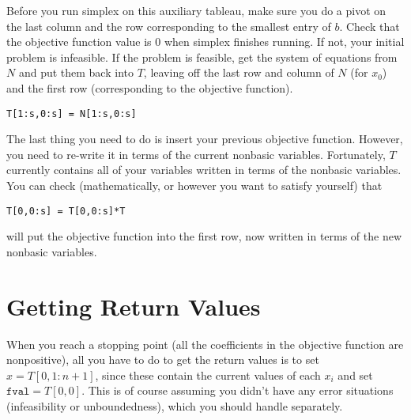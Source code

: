 Before you run simplex on this auxiliary tableau, make sure you do a pivot on the last column and the row corresponding to the smallest entry of $b$. Check that the objective function value is 0 when simplex finishes running. If not, your initial problem is infeasible. If the problem is feasible, get the system of equations from $N$ and put them back into $T$, leaving off the last row and column of $N$ (for $x_0$) and the first row (corresponding to the objective function).
\begin{lstlisting}
T[1:s,0:s] = N[1:s,0:s]
\end{lstlisting}
The last thing you need to do is insert your previous objective function. However, you need to re-write it in terms of the current nonbasic variables. Fortunately, $T$ currently contains all of your variables written in terms of the nonbasic variables. You can check (mathematically, or however you want to satisfy yourself) that
\begin{lstlisting}
T[0,0:s] = T[0,0:s]*T
\end{lstlisting}
will put the objective function into the first row, now written in terms of the new nonbasic variables.

\section*{Getting Return Values}

When you reach a stopping point (all the coefficients in the objective function are nonpositive), all you have to do to get the return values is to set $x = T[0,1:n+1]$, since these contain the current values of each $x_i$ and set $\mathtt{fval} = T[0,0]$. This is of course assuming you didn't have any error situations (infeasibility or unboundedness), which you should handle separately.
